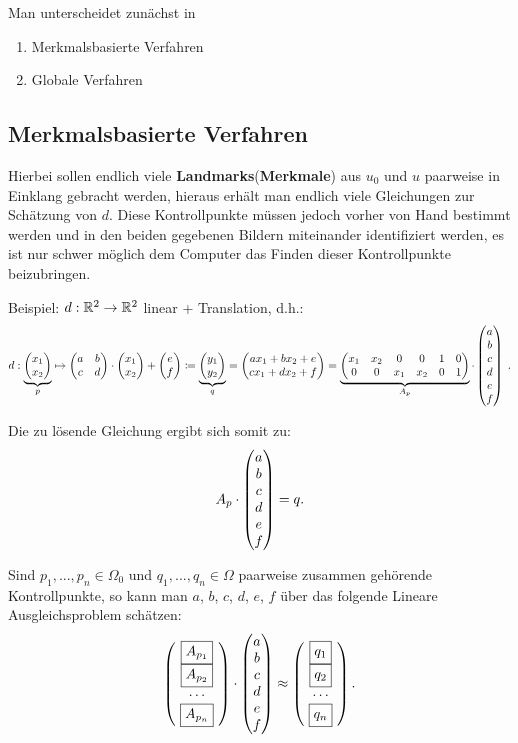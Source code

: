 Man unterscheidet zunächst in
\begin{enumerate}
    \item[\textbullet] Merkmalsbasierte Verfahren
    \item[\textbullet] Globale Verfahren
\end{enumerate}

\subsection{Merkmalsbasierte Verfahren}

Hierbei sollen endlich viele \textbf{Landmarks}(\textbf{Merkmale}) aus $u_0$ und $u$ paarweise in Einklang gebracht werden, hieraus erhält man endlich viele Gleichungen zur Schätzung von $d$. Diese Kontrollpunkte müssen jedoch vorher von Hand bestimmt werden und in den beiden gegebenen Bildern miteinander identifiziert werden, es ist nur schwer möglich dem Computer das Finden dieser Kontrollpunkte beizubringen.

Beispiel: $d:\mathbb R^2 \to \mathbb R^2$ linear + Translation, d.h.:
\[ d:\underbrace{\begin{pmatrix} x_1 \\ x_2 \end{pmatrix}}_{p} \mapsto \begin{pmatrix} a & b \\ c & d \end{pmatrix} \cdot \begin{pmatrix} x_1 \\ x_2 \end{pmatrix}+ \begin{pmatrix} e\\f \end{pmatrix} \coloneqq \underbrace{\begin{pmatrix} y_1 \\ y_2 \end{pmatrix}}_{q} = \begin{pmatrix} ax_1 + bx_2 +e\\ cx_1 + dx_2 + f \end{pmatrix} = \underbrace{\begin{pmatrix} x_1 & x_2 & 0 & 0 & 1 & 0\\ 0 & 0 & x_1 & x_2 & 0 & 1 \end{pmatrix}}_{A_p}\cdot \begin{pmatrix} a\\b\\c\\d\\e\\f \end{pmatrix}\;.\]

Die zu lösende Gleichung ergibt sich somit zu:
\[A_p \cdot \begin{pmatrix} a\\b\\c\\d\\e\\f \end{pmatrix} = q.\]

Sind $p_1,...,p_n \in \Omega_0$ und $q_1,...,q_n \in \Omega$ paarweise zusammen gehörende Kontrollpunkte, so kann man $a$, $b$, $c$, $d$, $e$, $f$ über das folgende Lineare Ausgleichsproblem schätzen:
\[ \mat{\ \boxed{A_{p_1}} \ \\ \ \boxed{A_{p_2}} \ \\ \cdots \\ \ \boxed{A_{p_n}} \ } \C \mat{a\\b\\c\\d\\e\\f} \approx \mat{\ \boxed{q_1 \vphantom{A_{p_1}}} \ \\ \ \boxed{q_2 \vphantom{A_{p_1}}} \ \\ \cdots \\ \ \boxed{q_n \vphantom{A_{p_1}}} \ }.\]

